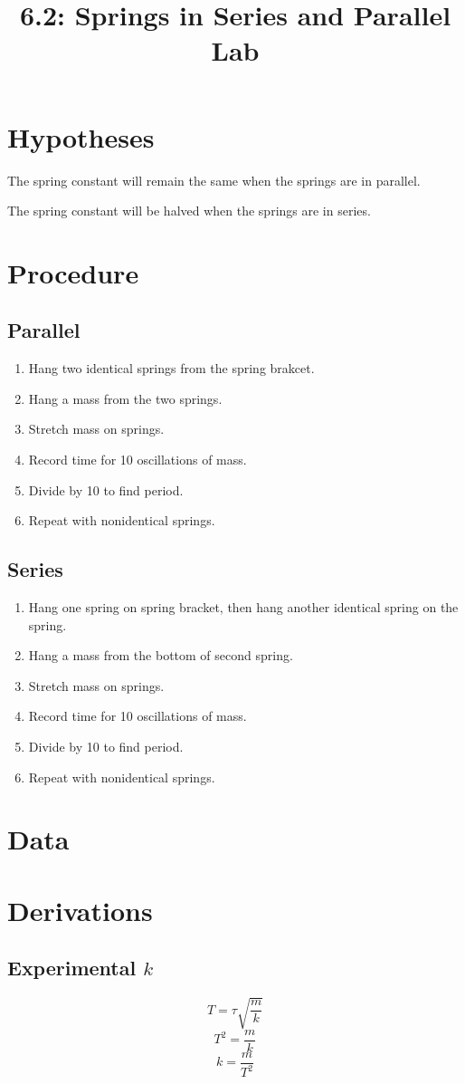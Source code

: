 \documentclass{article}
\title{6.2: Springs in Series and Parallel Lab}
\begin{document}
\section{Hypotheses}
The spring constant will remain the same when the springs are in parallel.

\noindent
The spring constant will be halved when the springs are in series.
\section{Procedure}
\subsection{Parallel}
\begin{enumerate}
    \item Hang two identical springs from the spring brakcet.
    \item Hang a mass from the two springs.
    \item Stretch mass on springs.
    \item Record time for 10 oscillations of mass.
    \item Divide by 10 to find period.
    \item Repeat with nonidentical springs.
\end{enumerate}
\subsection{Series}
\begin{enumerate}
    \item Hang one spring on spring bracket, then hang another identical spring on the spring.
    \item Hang a mass from the bottom of second spring.
    \item Stretch mass on springs.
    \item Record time for 10 oscillations of mass.
    \item Divide by 10 to find period.
    \item Repeat with nonidentical springs.
\end{enumerate}
\section{Data}
\section{Derivations}
\subsection{Experimental $k$}
\[T = \tau\sqrt{\frac{m}{k}}\]
\[T^2 = \frac{m}{k}\]
\[k = \frac{m}{T^2}\]
\end{document}
